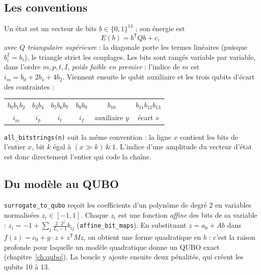 \subsection{Les conventions}
Un état est un vecteur de bits $b\in\{0,1\}^{14}$ ; son énergie est
\[
E(b)=b^{\mathsf T}Qb+c,
\]
avec $Q$ \emph{triangulaire supérieure} : la diagonale porte les termes linéaires (puisque $b_i^2=b_i$), le triangle strict les couplages. Les bits sont rangés variable par variable, dans l'ordre $m,p,t,I$, \emph{poids faible en premier} : l'indice de $m$ est $i_m=b_0+2b_1+4b_2$. Viennent ensuite le qubit auxiliaire et les trois qubits d'écart des contraintes :
\begin{center}
\begin{tabular}{cccccc}
\toprule
$b_0b_1b_2$ & $b_3b_4$ & $b_5b_6b_7$ & $b_8b_9$ & $b_{10}$ & $b_{11}b_{12}b_{13}$ \\
$i_m$ & $i_p$ & $i_t$ & $i_I$ & auxiliaire $y$ & écart $s$ \\
\bottomrule
\end{tabular}
\end{center}
\texttt{all\_bitstrings(n)} suit la même convention : la ligne $x$ contient les bits de l'entier $x$, bit $k$ égal à $(x \gg k)\,\&\,1$. L'indice d'une amplitude du vecteur d'état est donc directement l'entier qui code la chaîne.

\subsection{Du modèle au QUBO}
\texttt{surrogate\_to\_qubo} reçoit les coefficients d'un polynôme de degré 2 en variables normalisées $z_i\in[-1,1]$. Chaque $z_i$ est une fonction \emph{affine} des bits de sa variable : $z_i=-1+\sum_j\frac{2\cdot2^j}{L_i-1}b_{ij}$ (\texttt{affine\_bit\_maps}). En substituant $z=a_0+Ab$ dans $f(z)=c_0+g\cdot z+z^{\mathsf T}Mz$, on obtient une forme quadratique en $b$ : c'est la raison profonde pour laquelle un modèle quadratique donne un QUBO exact (chapitre~\ref{ch:qubo}). La boucle y ajoute ensuite deux pénalités, qui créent les qubits 10 à 13.

